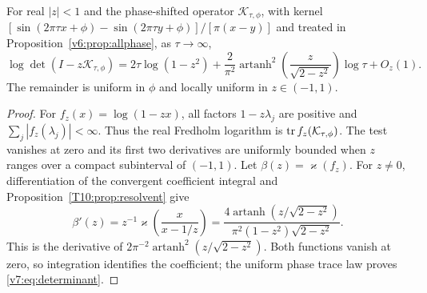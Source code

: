 \begin{corollary}\label{v7:cor:determinant}
For real $|z|<1$ and the phase-shifted operator $\mathcal K_{\tau,\phi}$,
with kernel $[\sin(2\pi\tau x+\phi)-\sin(2\pi\tau y+\phi)]/[\pi(x-y)]$ and
treated in Proposition~\ref{v6:prop:allphase}, as $\tau\to\infty$,
\begin{equation}\label{v7:eq:determinant}
 \log\det(I-z\mathcal K_{\tau,\phi})
 =2\tau\log(1-z^2)
 +\frac2{\pi^2}\operatorname{artanh}^2
       \!\left(\frac{z}{\sqrt{2-z^2}}\right)\log\tau+O_z(1).
\end{equation}
The remainder is uniform in $\phi$ and locally uniform in $z\in(-1,1)$.
\end{corollary}
\begin{proof}
For $f_z(x)=\log(1-zx)$, all factors $1-z\lambda_j$ are positive and
$\sum_j|f_z(\lambda_j)|<\infty$.  Thus the real Fredholm logarithm is
$\operatorname{tr} f_z(\mathcal K_{\tau,\phi})$.  The test vanishes at zero and its
first two derivatives are uniformly bounded when $z$ ranges over a
compact subinterval of $(-1,1)$. Let $\beta(z)=\varkappa(f_z)$.
For $z\ne0$, differentiation of the convergent coefficient integral
and Proposition~\ref{T10:prop:resolvent} give
\[
 \beta'(z)=z^{-1}\varkappa\!\left(\frac{x}{x-1/z}\right)
 =\frac{4\operatorname{artanh}(z/\sqrt{2-z^2})}
 {\pi^2(1-z^2)\sqrt{2-z^2}}.
\]
This is the derivative of
$2\pi^{-2}\operatorname{artanh}^2(z/\sqrt{2-z^2})$.
Both functions vanish at zero, so integration identifies the coefficient;
the uniform phase trace law proves \eqref{v7:eq:determinant}.
\end{proof}

